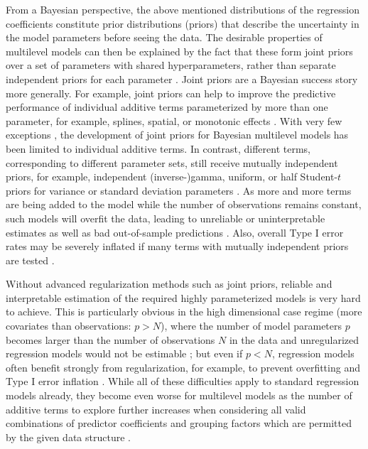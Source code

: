 From a Bayesian perspective, the above mentioned distributions of the regression coefficients constitute prior distributions (priors) that describe the uncertainty in the model parameters before seeing the data. The desirable properties of multilevel models can then be explained by the fact that these form joint priors over a set of parameters with shared hyperparameters, rather than separate independent priors for each parameter \citep{gelman2013bda}. Joint priors are a Bayesian success story more generally. For example, joint priors can help to improve the predictive performance of individual additive terms parameterized by more than one parameter, for example, splines, spatial, or monotonic effects \citep{buerknermonotonic, wood2017generalized, Morris2019BayesianHS}. With very few exceptions \citep{Fulgstad2019,rstanarm,Yanchenko}, the development of joint priors for Bayesian multilevel models has been limited to individual additive terms. In contrast, different terms, corresponding to different parameter sets, still receive mutually independent priors, for example, independent (inverse-)gamma, uniform, or half Student-$t$ priors for variance or standard deviation parameters  \citep{BrowneDraper,brmsJSS, pcpriors,Depaoli2015ABA}. As more and more terms are being added to the model while the number of observations remains constant, such models will overfit the data, leading to unreliable or uninterpretable estimates as well as bad out-of-sample predictions \citep{BayesPenalizedRegSara}. Also, overall Type I error rates may be severely inflated if many terms with mutually independent priors are tested \citep{gelman2013bda}.

Without advanced regularization methods such as joint priors, reliable and interpretable estimation of the required highly parameterized models is very hard to achieve. This is particularly obvious in the high dimensional case regime (more covariates than observations: $p>N$), where the number of model parameters $p$ becomes larger than the number of observations $N$ in the data and unregularized regression models would not be estimable \citep{Ridge}; but even if $p<N$, regression models often benefit strongly from regularization, for example, to prevent overfitting and Type I error inflation \citep{Ridge, gelman2013bda, BayesPenalizedRegSara}. While all of these difficulties apply to standard regression models already, they become even worse for multilevel models as the number of additive terms to explore further increases when considering all valid combinations of predictor coefficients and grouping factors which are permitted by the given data structure \citep{catalina2020projection, Barr2013RandomES, Paananen2020GroupHA}.

